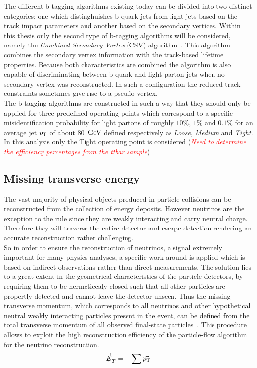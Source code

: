 The different b-tagging algorithms existing today can be divided into two distinct categories; one which distinghuishes b-quark jets from light jets based on the track impact parameters and another based on the secondary vertices. Within this thesis only the second type of b-tagging algorithms will be considered, namely the \textit{Combined Secondary Vertex} (CSV) algorithm~\cite{}. This algorithm combines the secondary vertex information with the track-based lifetime properties. Because both characteristics are combined the algorithm is also capable of discriminating between b-quark and light-parton jets when no secondary vertex was reconstructed. In such a configuration the reduced track constraints sometimes give rise to a pseudo-vertex.
\\
The b-tagging algorithms are constructed in such a way that they should only be applied for three predefined operating points which correspond to a specific misidentification probability for light partons of roughly $10 \%$, $1 \%$ and $0.1 \%$ for an average jet $p_{\rm T}$ of about $80$ $\, \mathrm{GeV}$ defined respectively as \textit{Loose}, \textit{Medium} and \textit{Tight}. In this analysis only the Tight operating point is considered (\textit{\textcolor{red}{Need to determine the efficiency percentages from the ttbar sample}})

\subsection{Missing transverse energy}\label{subsec::MET}

The vast majority of physical objects produced in particle collisions can be reconstructed from the collection of energy deposits. 
However neutrinos are the exception to the rule since they are weakly interacting and carry neutral charge. Therefore they will traverse the entire detector and escape detection rendering an accurate reconstruction rather challenging.
\\
So in order to ensure the reconstruction of neutrinos, a signal extremely important for many physics analyses, a specific work-around is applied which is based on indirect observations rather than direct measurements. The solution lies to a great extent in the geometrical characteristics of the particle detectors, by requiring them to be hermeticcaly closed such that all other particles are propertly detected and cannot leave the detector unseen.
Thus the missing transverse momentum, which corresponds to all neutrinos and other hypothetical neutral weakly interacting particles present in the event, can be defined from the total transverse momentum of all observed final-state particles~\cite{}. This procedure allows to exploit the high reconstruction efficiency of the particle-flow algorithm for the neutrino reconstruction.
\begin{equation}
 \vecmet = - \sum \vec{\pT}
\end{equation}
